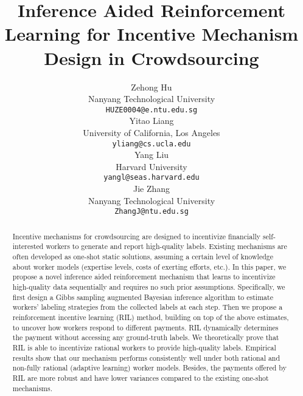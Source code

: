 \documentclass{article}
\title{Inference Aided Reinforcement Learning for Incentive Mechanism Design in Crowdsourcing}
\author{
  Zehong Hu \\
  Nanyang Technological University\\
  \texttt{HUZE0004@e.ntu.edu.sg} \\
  \And
  Yitao Liang \\
  University of California, Los Angeles \\
  \texttt{yliang@cs.ucla.edu} \\
  \AND
  Yang Liu \\
  Harvard University \\
  \texttt{yangl@seas.harvard.edu} \\
  \And
  Jie Zhang \\
  Nanyang Technological University\\
  \texttt{ZhangJ@ntu.edu.sg} \\
}
\newcommand{\com}[1]{\textbf{\color{red}(COMMENT: #1)}} %
\newcommand{\com}[1]{}
\begin{document}

\maketitle

\begin{abstract}
Incentive mechanisms for crowdsourcing are designed to incentivize financially self-interested workers to generate and report high-quality labels. Existing mechanisms are often developed as one-shot static solutions, assuming a certain level of knowledge about worker models (expertise levels, costs of exerting efforts, etc.). In this paper, we propose a novel inference aided reinforcement mechanism %
that learns to incentivize high-quality data sequentially and requires no such prior assumptions.
Specifically, we first design a Gibbs sampling augmented Bayesian inference algorithm to estimate workers' labeling strategies from the collected labels at each step. Then we propose a reinforcement incentive learning (RIL) method, building on top of the above estimates, to uncover how workers respond to different payments. RIL dynamically determines the payment without accessing any ground-truth labels. We theoretically prove that RIL is able to incentivize rational workers to provide high-quality labels. Empirical results show that our mechanism performs consistently well under both rational and non-fully rational (adaptive learning) worker models. Besides, the payments offered by RIL are more robust
and have lower variances compared to the existing one-shot mechanisms.
\end{abstract}
\end{document}
